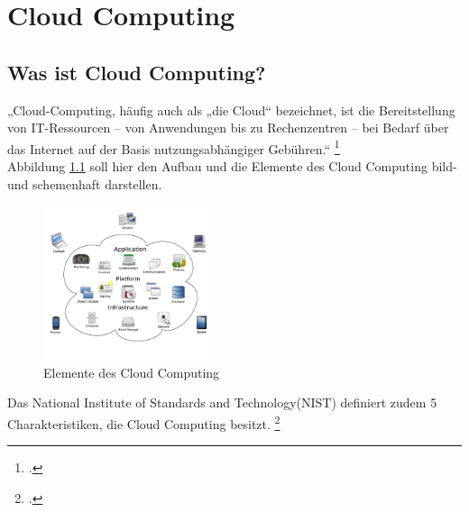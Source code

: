 \chapter{Cloud Computing} %
\label{cha:Cloud Computing}

\section{Was ist Cloud Computing?} %
\label{sec:Was ist Cloud Computing}

„Cloud-Computing, häufig auch als „die Cloud“ bezeichnet, ist die Bereitstellung von IT-Ressourcen – von Anwendungen bis zu Rechenzentren – bei Bedarf über das Internet auf der Basis nutzungsabhängiger Gebühren.“ \footcite[][]{o.V..2020} \\
Abbildung \ref{abb:ElementeCloudComputing} soll hier den Aufbau und die Elemente des Cloud Computing bild- und schemenhaft darstellen.

\begin{figure}[htb]
	\centering
	\includegraphics[width=5cm]{graphics/CloudComputing.png}
	\caption[Elemente des Cloud Computing]{Elemente des Cloud Computing \footnotemark}
	\label{abb:ElementeCloudComputing}
\end{figure}

Das National Institute of Standards and Technology(NIST) definiert zudem 5 Charakteristiken, die Cloud Computing besitzt. \footcite[Vgl.][auch im Folgenden]{Mell.2011}

